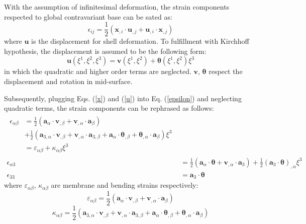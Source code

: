 With the assumption of infinitesimal deformation, the strain components respected to global contravariant base can be sated as:
\begin{equation}\label{epsilon}
\epsilon_{ij} = \frac{1}{2}(\boldsymbol x_{,i} \cdot \boldsymbol u_{,j} + \boldsymbol u_{,i} \cdot \boldsymbol x_{,j})
\end{equation}
where $\boldsymbol u$ is the displacement for shell deformation. To fulfillment with Kirchhoff hypothesis, the displacement is assumed to be the following form:
\begin{equation}\label{u}
\boldsymbol u(\xi^1,\xi^2,\xi^3) = \boldsymbol v(\xi^1,\xi^2) + \boldsymbol \theta(\xi^1,\xi^2) \xi^3
\end{equation}
in which the quadratic and higher order terms are neglected. $\boldsymbol v$, $\boldsymbol \theta$ respect the displacement and rotation in mid-surface.

Subsequently, plugging Eqs. (\ref{x}) and (\ref{u}) into Eq. (\ref{epsilon}) and neglecting quadratic terms, the strain components can be rephrased as follows:
\begin{subequations}
\begin{align}
\begin{split}
\epsilon_{\alpha\beta} &= \frac{1}{2}(\boldsymbol a_\alpha \cdot \boldsymbol v_{,\beta} + \boldsymbol v_{,\alpha}\cdot \boldsymbol a_\beta) \\ 
&+ \frac{1}{2}(\boldsymbol a_{3,\alpha} \cdot \boldsymbol v_{,\beta} + \boldsymbol v_{,\alpha}\cdot \boldsymbol a_{3,\beta} + \boldsymbol a_\alpha \cdot \boldsymbol \theta_{,\beta} + \boldsymbol \theta_{,\alpha}\cdot \boldsymbol a_\beta)\xi^3 \\
&= \varepsilon_{\alpha\beta} + \kappa_{\alpha\beta}\xi^3
\end{split} \\
\epsilon_{\alpha 3} &= \frac{1}{2}(\boldsymbol a_\alpha \cdot \boldsymbol \theta + \boldsymbol v_{,\alpha}\cdot \boldsymbol a_3) + \frac{1}{2} (\boldsymbol a_3 \cdot \boldsymbol \theta)_{,\alpha}\xi^3 \\ 
\epsilon_{33} &= \boldsymbol a_3 \cdot \boldsymbol \theta
\end{align}
\end{subequations}
where $\varepsilon_{\alpha\beta}$, $\kappa_{\alpha\beta}$ are membrane and bending strains respectively:
\begin{equation}
\varepsilon_{\alpha\beta} = \frac{1}{2}(\boldsymbol a_\alpha \cdot \boldsymbol v_{,\beta} + \boldsymbol v_{,\alpha}\cdot \boldsymbol a_\beta) 
\end{equation}
\begin{equation}\label{kappa1}
\kappa_{\alpha\beta} = \frac{1}{2}(\boldsymbol a_{3,\alpha} \cdot \boldsymbol v_{,\beta} + \boldsymbol v_{,\alpha}\cdot \boldsymbol a_{3,\beta} + \boldsymbol a_\alpha \cdot \boldsymbol \theta_{,\beta} + \boldsymbol \theta_{,\alpha}\cdot \boldsymbol a_\beta)
\end{equation}

